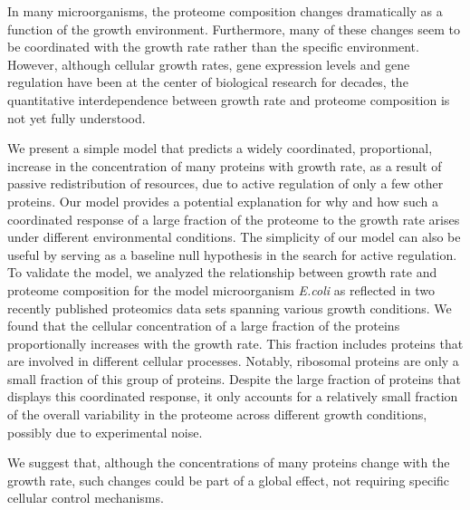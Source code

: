 In many microorganisms, the proteome composition changes dramatically as a function of the growth environment.
Furthermore, many of these changes seem to be coordinated with the growth rate rather than the specific environment.
However, although cellular growth rates, gene expression levels and gene regulation have been at the center of biological research for decades, the quantitative interdependence between growth rate and proteome composition is not yet fully understood.

We present a simple model that predicts a widely coordinated, proportional, increase in the concentration of many proteins with growth rate, as a result of passive redistribution of resources, due to active regulation of only a few other proteins.
Our model provides a potential explanation for why and how such a coordinated response of a large fraction of the proteome to the growth rate arises under different environmental conditions.
The simplicity of our model can also be useful by serving as a baseline null hypothesis in the search for active regulation.
To validate the model, we analyzed the relationship between growth rate and proteome composition for the model microorganism \emph{E.coli} as reflected in two recently published proteomics data sets spanning various growth conditions.
We found that the cellular concentration of a large fraction of the proteins proportionally increases with the growth rate.
This fraction includes proteins that are involved in different cellular processes.
Notably, ribosomal proteins are only a small fraction of this group of proteins.
Despite the large fraction of proteins that displays this coordinated response, it only accounts for a relatively small fraction of the overall variability in the proteome across different growth conditions, possibly due to experimental noise.

We suggest that, although the concentrations of many proteins change with the growth rate, such changes could be part of a global effect, not requiring specific cellular control mechanisms.